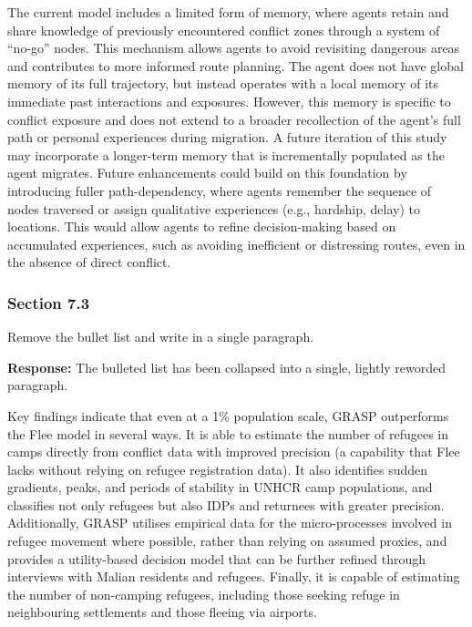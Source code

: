\documentclass[11pt,a4paper]{article}
\begin{document}
\vspace{0.3cm}
\begin{updatebox}
The current model includes a limited form of memory, where agents retain and share knowledge of previously encountered
conflict zones through a system of ``no-go'' nodes. This mechanism allows agents to avoid revisiting dangerous areas and
contributes to more informed route planning. The agent does not have global memory of its full trajectory, but instead
operates with a local memory of its immediate past interactions and exposures. However, this memory is specific to
conflict exposure and does not extend to a broader recollection of the agent's full path or personal experiences during
migration. A future iteration of this study may incorporate a longer-term memory that is incrementally populated as the
agent migrates. Future enhancements could build on this foundation by introducing fuller path-dependency, where agents
remember the sequence of nodes traversed or assign qualitative experiences (e.g., hardship, delay) to locations. This
would allow agents to refine decision-making based on accumulated experiences, such as avoiding inefficient or
distressing routes, even in the absence of direct conflict.
\end{updatebox}

\subsubsection*{Section 7.3}

\begin{reviewbox}
Remove the bullet list and write in a single paragraph.
\end{reviewbox}

\textbf{Response:} The bulleted list has been collapsed into a single, lightly reworded paragraph.

\vspace{0.3cm}
\begin{updatebox}
Key findings indicate that even at a 1\% population scale, GRASP outperforms the Flee model in several ways. It is able to
estimate the number of refugees in camps directly from conflict data with improved precision (a capability that Flee lacks
without relying on refugee registration data). It also identifies sudden gradients, peaks, and periods of stability in UNHCR
camp populations, and classifies not only refugees but also IDPs and returnees with greater precision. Additionally, GRASP
utilises empirical data for the micro-processes involved in refugee movement where possible, rather than relying on assumed
proxies, and provides a utility-based decision model that can be further refined through interviews with Malian residents and
refugees. Finally, it is capable of estimating the number of non-camping refugees, including those seeking refuge in
neighbouring settlements and those fleeing via airports.
\end{updatebox}
\end{document}
